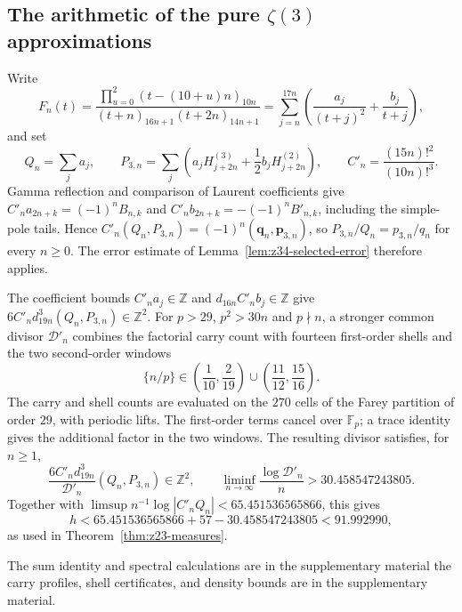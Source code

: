 \subsection{The arithmetic of the pure
\texorpdfstring{$\zeta(3)$}{zeta(3)} approximations}
\label{app:zeta3-measure}

Write
\[
 F_n(t)=\frac{\prod_{u=0}^{2}(t-(10+u)n)_{10n}}
 {(t+n)_{16n+1}(t+2n)_{14n+1}}
 =\sum_{j=n}^{17n}\left(\frac{a_j}{(t+j)^2}+\frac{b_j}{t+j}\right),
\]
and set
\[
 Q_n=\sum_ja_j,\qquad
 P_{3,n}=\sum_j\left(a_jH^{(3)}_{j+2n}
                       +\frac12b_jH^{(2)}_{j+2n}\right),\qquad
 C'_n=\frac{(15n)!^2}{(10n)!^3}.
\]
Gamma reflection and comparison of Laurent coefficients give
$C'_na_{2n+k}=(-1)^nB_{n,k}$ and
$C'_nb_{2n+k}=-(-1)^nB'_{n,k}$, including the simple-pole tails.
Hence $C'_n(Q_n,P_{3,n})=(-1)^n(\mathbf q_n,\mathbf p_{3,n})$,
so $P_{3,n}/Q_n=p_{3,n}/q_n$ for every $n\ge0$.
The error estimate of Lemma~\ref{lem:z34-selected-error} therefore applies.

The coefficient bounds $C'_na_j\in\mathbb Z$ and
$d_{16n}C'_nb_j\in\mathbb Z$ give
$6C'_nd_{19n}^3(Q_n,P_{3,n})\in\mathbb Z^2$.
For $p>29$, $p^2>30n$ and $p\nmid n$, a stronger common divisor
$\mathcal D'_n$ combines the factorial carry count with fourteen
first-order shells and the two second-order windows
\[
 \{n/p\}\in
 \left(\frac1{10},\frac2{19}\right)
 \cup\left(\frac{11}{12},\frac{15}{16}\right).
\]
The carry and shell counts are evaluated on the $270$ cells of the
Farey partition of order $29$, with periodic lifts.
The first-order terms cancel over $\mathbb F_p$; a trace identity
gives the additional factor in the two windows.
The resulting divisor satisfies, for $n\ge1$,
\[
 \frac{6C'_nd_{19n}^3}{\mathcal D'_n}(Q_n,P_{3,n})\in\mathbb Z^2,
 \qquad
 \liminf_{n\to\infty}\frac{\log\mathcal D'_n}{n}
 >30.458547243805.
\]
Together with
$\limsup n^{-1}\log|C'_nQ_n|<65.451536565866$, this gives
\[
 h<65.451536565866+57-30.458547243805<91.992990,
\]
as used in Theorem~\ref{thm:z23-measures}.

The sum identity and spectral calculations are in
the supplementary material the carry profiles, shell certificates, and density bounds are in
the supplementary material.


